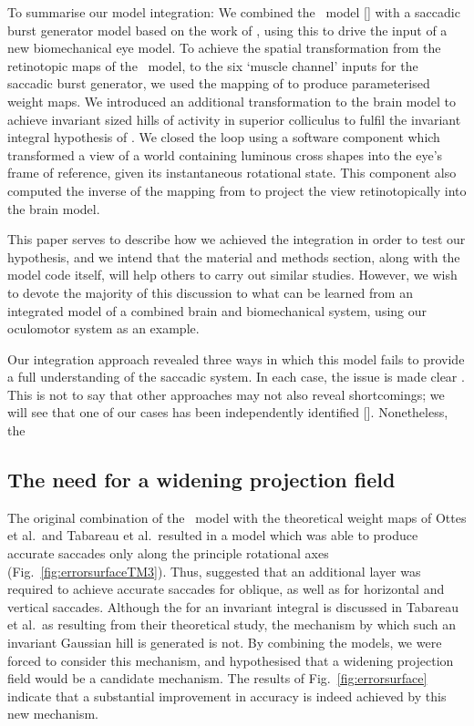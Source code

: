 \documentclass{frontiersSCNS}
\begin{document}
To summarise our model integration: We combined
the \ccg~model [\cite{cope_basal_2017}] with a saccadic burst generator
model based on the work of \cite{gancarz_neural_1998}, using this to
drive the input of a new biomechanical eye model. To achieve the spatial
transformation from the retinotopic maps of the \ccg~model, to the six
`muscle channel' inputs for the saccadic burst generator, we used
the mapping of \cite{ottes_visuomotor_1986} to produce parameterised
weight maps. We introduced an additional
transformation to the brain model to achieve invariant sized hills of
activity in superior colliculus to fulfil the invariant integral
hypothesis of \cite{tabareau_geometry_2007}. We closed the loop using
a software component which transformed a view of a world containing
luminous cross shapes into the eye's frame of reference, given its
instantaneous rotational state. This component also computed the inverse
of the mapping from \cite{ottes_visuomotor_1986} to project the view
retinotopically into the brain model.

This paper serves to describe how we achieved the integration in
order to test our hypothesis, and we intend that the material and
methods section, along with the model code itself, will help others
to carry out similar studies. However, we wish to devote the majority
of this discussion to what can be learned from an integrated model
of a combined brain and biomechanical system, using our oculomotor system
as an example.

Our integration approach revealed three ways in which this model fails
to provide a full understanding of the saccadic system. In each case,
the issue is made clear . This is not
to say that other approaches may not also reveal shortcomings; we will
see that one of our cases has been independently identified
[\cite{groh_effects_2011}]. Nonetheless, the

\subsection{The need for a widening projection field}

The original combination of the \ccg~model with the theoretical weight
maps of Ottes et al.~and Tabareau et al.~resulted in a model which was
able to produce accurate saccades only along the principle rotational
axes (Fig.~\ref{fig:errorsurfaceTM3}). Thus,  suggested that an additional
layer was required to achieve accurate saccades for oblique, as well
as for horizontal and vertical saccades. Although the  for an
invariant integral is discussed in Tabareau et al.~as resulting from
their theoretical study, the mechanism by which such an invariant
Gaussian hill is generated is not. By combining the models, we were
forced to consider this mechanism, and hypothesised that a widening
projection field would be a candidate mechanism. The results of
Fig.~\ref{fig:errorsurface} indicate that a substantial improvement
in accuracy is indeed achieved by this new mechanism.
\end{document}
